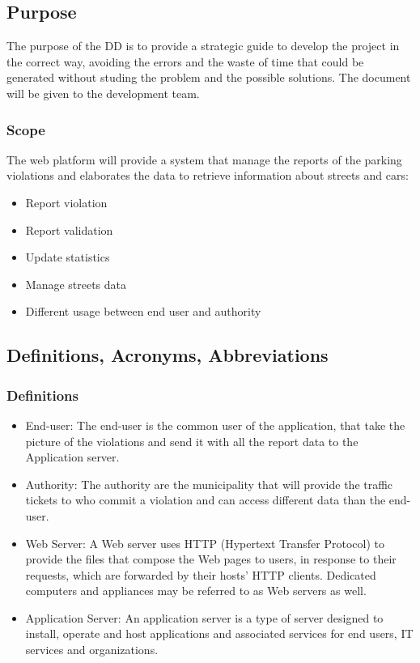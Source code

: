 \subsection{Purpose}
The purpose of the DD is to provide a strategic guide to develop the project in the correct way, avoiding the errors and the waste of time that could be generated without studing the problem and the possible solutions. The document will be given to the development team.
\subsubsection{Scope}
The web platform will provide a system that manage the reports of the parking violations and elaborates the data to retrieve information about streets and cars:
\begin{itemize}
	\item
	Report violation
	\item 
	Report validation
	\item
	Update statistics
	\item
	Manage streets data
	\item
	Different usage between end user and authority
\end{itemize}
\subsection{Definitions, Acronyms, Abbreviations}
\subsubsection{Definitions}
\begin{itemize}
	\item 
	End-user: The end-user is the common user of the application, that take the picture of the violations and send it with all the report data to the Application server.
	\item 
	Authority: The authority are the municipality that will provide the traffic tickets to who commit a violation and can access different data than the end-user.
	\item 
	Web Server: A Web server uses HTTP (Hypertext Transfer Protocol) to provide the files that compose the Web pages to users, in response to their requests, which are forwarded by their hosts' HTTP clients. Dedicated computers and appliances may be referred to as Web servers as well.
	\item 
	Application Server: An application server is a type of server designed to install, operate and host applications and associated services for end users, IT services and organizations.
\end{itemize}
